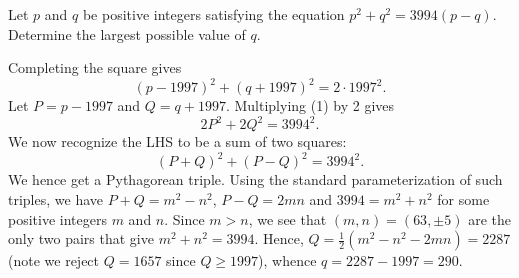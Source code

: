 \begin{question}[290]\label{Q::2020-O-1-25}
    Let $p$ and $q$ be positive integers satisfying the equation $p^2 + q^2 = 3994(p-q)$. Determine the largest possible value of $q$.
\end{question}
\begin{solution*}
    Completing the square gives \[(p-1997)^2 + (q+1997)^2 = 2 \cdot 1997^2. \tag{1}\] Let $P = p - 1997$ and $Q = q + 1997$. Multiplying (1) by 2 gives \[2P^2 + 2Q^2 = 3994^2.\] We now recognize the LHS to be a sum of two squares: \[(P+Q)^2 + (P-Q)^2 = 3994^2.\] We hence get a Pythagorean triple. Using the standard parameterization of such triples, we have $P+Q = m^2 - n^2$, $P-Q = 2mn$ and $3994 = m^2 + n^2$ for some positive integers $m$ and $n$. Since $m > n$, we see that $(m, n) = (63, \pm5)$ are the only two pairs that give $m^2 + n^2 = 3994$. Hence, $Q = \frac12 (m^2 - n^2 - 2mn) = 2287$ (note we reject $Q = 1657$ since $Q \geq 1997$), whence $q = 2287 - 1997 = 290$.
\end{solution*}